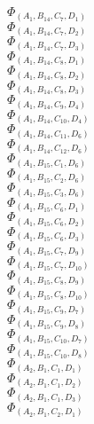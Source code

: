 \documentclass[14pt]{article}
\begin{document}
    $\Phi_{({A}_{1}, {B}_{14}, {C}_{7}, {D}_{1})}$ \\ 
    $\Phi_{({A}_{1}, {B}_{14}, {C}_{7}, {D}_{2})}$ \\ 
    $\Phi_{({A}_{1}, {B}_{14}, {C}_{7}, {D}_{3})}$ \\ 
    $\Phi_{({A}_{1}, {B}_{14}, {C}_{8}, {D}_{1})}$ \\ 
    $\Phi_{({A}_{1}, {B}_{14}, {C}_{8}, {D}_{2})}$ \\ 
    $\Phi_{({A}_{1}, {B}_{14}, {C}_{8}, {D}_{3})}$ \\ 
    $\Phi_{({A}_{1}, {B}_{14}, {C}_{9}, {D}_{4})}$ \\ 
    $\Phi_{({A}_{1}, {B}_{14}, {C}_{10}, {D}_{4})}$ \\ 
    $\Phi_{({A}_{1}, {B}_{14}, {C}_{11}, {D}_{6})}$ \\ 
    $\Phi_{({A}_{1}, {B}_{14}, {C}_{12}, {D}_{6})}$ \\ 
    $\Phi_{({A}_{1}, {B}_{15}, {C}_{1}, {D}_{6})}$ \\ 
    $\Phi_{({A}_{1}, {B}_{15}, {C}_{2}, {D}_{6})}$ \\ 
    $\Phi_{({A}_{1}, {B}_{15}, {C}_{3}, {D}_{6})}$ \\ 
    $\Phi_{({A}_{1}, {B}_{15}, {C}_{6}, {D}_{1})}$ \\ 
    $\Phi_{({A}_{1}, {B}_{15}, {C}_{6}, {D}_{2})}$ \\ 
    $\Phi_{({A}_{1}, {B}_{15}, {C}_{6}, {D}_{3})}$ \\ 
    $\Phi_{({A}_{1}, {B}_{15}, {C}_{7}, {D}_{9})}$ \\ 
    $\Phi_{({A}_{1}, {B}_{15}, {C}_{7}, {D}_{10})}$ \\ 
    $\Phi_{({A}_{1}, {B}_{15}, {C}_{8}, {D}_{9})}$ \\ 
    $\Phi_{({A}_{1}, {B}_{15}, {C}_{8}, {D}_{10})}$ \\ 
    $\Phi_{({A}_{1}, {B}_{15}, {C}_{9}, {D}_{7})}$ \\ 
    $\Phi_{({A}_{1}, {B}_{15}, {C}_{9}, {D}_{8})}$ \\ 
    $\Phi_{({A}_{1}, {B}_{15}, {C}_{10}, {D}_{7})}$ \\ 
    $\Phi_{({A}_{1}, {B}_{15}, {C}_{10}, {D}_{8})}$ \\ 
    $\Phi_{({A}_{2}, {B}_{1}, {C}_{1}, {D}_{1})}$ \\ 
    $\Phi_{({A}_{2}, {B}_{1}, {C}_{1}, {D}_{2})}$ \\ 
    $\Phi_{({A}_{2}, {B}_{1}, {C}_{1}, {D}_{3})}$ \\ 
    $\Phi_{({A}_{2}, {B}_{1}, {C}_{2}, {D}_{1})}$ \\ 
\end{document}
